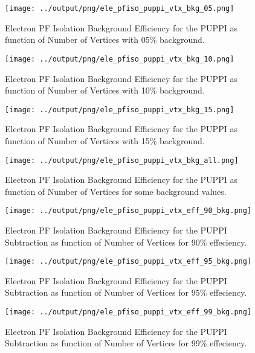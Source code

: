 \documentclass[11pt]{book}
\begin{document}
\begin{figure}[htb]
\centering
\texttt{[image: ../output/png/ele\_pfiso\_puppi\_vtx\_bkg\_05.png]}
\caption{Electron PF Isolation Background Efficiency for the PUPPI as function of Number of Vertices with 05\% background.}
\label{fig:ele_pfiso_vtx_bkg_puppi_bkg_05}
\end{figure}

\begin{figure}[htb]
\centering
\texttt{[image: ../output/png/ele\_pfiso\_puppi\_vtx\_bkg\_10.png]}
\caption{Electron PF Isolation Background Efficiency for the PUPPI as function of Number of Vertices with 10\% background.}
\label{fig:ele_pfiso_vtx_bkg_puppi_bkg_10}
\end{figure}

\begin{figure}[htb]
\centering
\texttt{[image: ../output/png/ele\_pfiso\_puppi\_vtx\_bkg\_15.png]}
\caption{Electron PF Isolation Background Efficiency for the PUPPI as function of Number of Vertices with 15\% background.}
\label{fig:ele_pfiso_vtx_bkg_puppi_bkg_15}
\end{figure}

\begin{figure}[htb]
\centering
\texttt{[image: ../output/png/ele\_pfiso\_puppi\_vtx\_bkg\_all.png]}
\caption{Electron PF Isolation Background Efficiency for the PUPPI as function of Number of Vertices for some background values.}
\label{fig:ele_pfiso_vtx_bkg_puppi_bkg_all}
\end{figure}

\begin{figure}[htb]
\centering
\texttt{[image: ../output/png/ele\_pfiso\_puppi\_vtx\_eff\_90\_bkg.png]}
\caption{Electron PF Isolation Background Efficiency for the PUPPI Subtraction as function of Number of Vertices for 90\% effeciency.}
\label{fig:ele_pfiso_vtx_eff_puppi_eff_90_bkg}
\end{figure}

\begin{figure}[htb]
\centering
\texttt{[image: ../output/png/ele\_pfiso\_puppi\_vtx\_eff\_95\_bkg.png]}
\caption{Electron PF Isolation Background Efficiency for the PUPPI Subtraction as function of Number of Vertices for 95\% effeciency.}
\label{fig:ele_pfiso_vtx_eff_puppi_eff_95_bkg}
\end{figure}

\begin{figure}[htb]
\centering
\texttt{[image: ../output/png/ele\_pfiso\_puppi\_vtx\_eff\_99\_bkg.png]}
\caption{Electron PF Isolation Background Efficiency for the PUPPI Subtraction as function of Number of Vertices for 99\% effeciency.}
\label{fig:ele_pfiso_vtx_eff_puppi_eff_99_bkg}
\end{figure}
\end{document}
